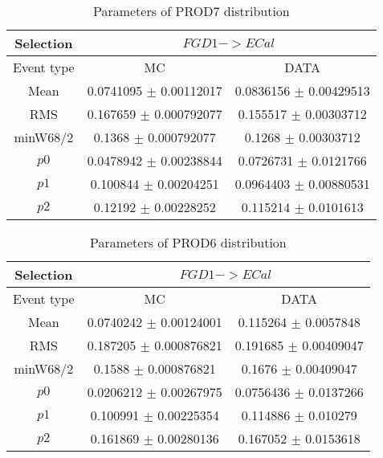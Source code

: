 \documentclass[a4paper,12pt]{article}
\begin{document}
\begin{table}[htbp]
\begin{center}
\begin{tabular}{|c|c|c|}
        \hline
        Selection & \multicolumn{2}{|c|}{$FGD1->ECal$}  \\ \hline
        Event type & MC & DATA \\ 
        \hline
        Mean & 0.0741095 $\pm$ 0.00112017 & 0.0836156 $\pm$ 0.00429513 \\ 
        \hline 
        RMS & 0.167659 $\pm$ 0.000792077 & 0.155517 $\pm$ 0.00303712 \\ 
        \hline 
        minW68/2 & 0.1368 $\pm$ 0.000792077 & 0.1268 $\pm$ 0.00303712 \\ 
        \hline 
        $p0$ & 0.0478942 $\pm$ 0.00238844 & 0.0726731 $\pm$ 0.0121766 \\ 
        \hline 
        $p1$ & 0.100844 $\pm$ 0.00204251 & 0.0964403 $\pm$ 0.00880531 \\ 
        \hline 
        $p2$ & 0.12192 $\pm$ 0.00228252 & 0.115214 $\pm$ 0.0101613 \\ 
        \hline 
\end{tabular}
\caption{Parameters of PROD7 distribution } \vspace{0.2in}
\label{xxx}
\end{center}
\end{table}
\begin{table}[htbp]
\begin{center}
\begin{tabular}{|c|c|c|}
        \hline
        Selection & \multicolumn{2}{|c|}{$FGD1->ECal$}  \\ \hline
        Event type & MC & DATA \\ 
        \hline
        Mean & 0.0740242 $\pm$ 0.00124001 & 0.115264 $\pm$ 0.0057848 \\ 
        \hline 
        RMS & 0.187205 $\pm$ 0.000876821 & 0.191685 $\pm$ 0.00409047 \\ 
        \hline 
        minW68/2 & 0.1588 $\pm$ 0.000876821 & 0.1676 $\pm$ 0.00409047 \\ 
        \hline 
        $p0$ & 0.0206212 $\pm$ 0.00267975 & 0.0756436 $\pm$ 0.0137266 \\ 
        \hline 
        $p1$ & 0.100991 $\pm$ 0.00225354 & 0.114886 $\pm$ 0.010279 \\ 
        \hline 
        $p2$ & 0.161869 $\pm$ 0.00280136 & 0.167052 $\pm$ 0.0153618 \\ 
        \hline 
\end{tabular}
\caption{Parameters of PROD6 distribution } \vspace{0.2in}
\label{xxx}
\end{center}
\end{table}
\end{document}

